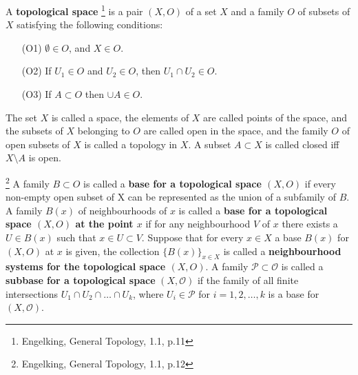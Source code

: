 \begin{definition} \label{D:topo}
A \textbf{topological space} 
\footnote{Engelking, General Topology, 1.1, p.11}
is a pair $(X,O)$ of a set $X$ and a family $O$ of
subsets of $X$ satisfying the following conditions:
\begin{enumerate}
  \item[(O1)] $\emptyset\in O$, and $X\in O$.
  \item[(O2)] If $U_1\in O$ and $U_2\in O$, then $U_1\cap U_2\in O$.
  \item[(O3)] If $A\subset O$ then $\cup A\in O$.
\end{enumerate}
The set $X$ is called a space, the elements of $X$ are called points of the
space, and the subsets of $X$ belonging to $O$ are called open in the space, and
the family $O$ of open subsets of $X$ is called a topology in $X$. A subset
$A\subset X$ is called closed iff $X\setminus A$ is open.
\end{definition}


\begin{definition} 
\footnote{Engelking, General Topology, 1.1, p.12}
A family $B\subset O$ is called a \textbf{base for a topological space $(X,O)$}
if every non-empty open subset of X can be represented as the union of a
subfamily of $B$. A family $B(x)$ of neighbourhoods of $x$ is called a 
\textbf{base for a topological space $(X,O)$ at the point $x$}
if for any neighbourhood $V$ of $x$ there exists a $U\in B(x)$ such that 
$x\in U\subset V$. Suppose that for every $x\in X$ a base $B(x)$ for $(X,O)$ at 
$x$ is given, the collection $\{B(x)\}_{x\in X}$ is called a 
\textbf{neighbourhood systems for the topological space $(X,O)$}. 
A family $\mathcal{P}\subset\mathcal{O}$ is called a \textbf{subbase for a
topological space} $(X,\mathcal{O})$ 
if the family of all finite intersections $U_1\cap U_2\cap \dots\cap U_k$, where
$U_i\in\mathcal{P}$ for $i=1,2,\dots,k$ is a base for $(X,\mathcal{O})$.
\end{definition}


